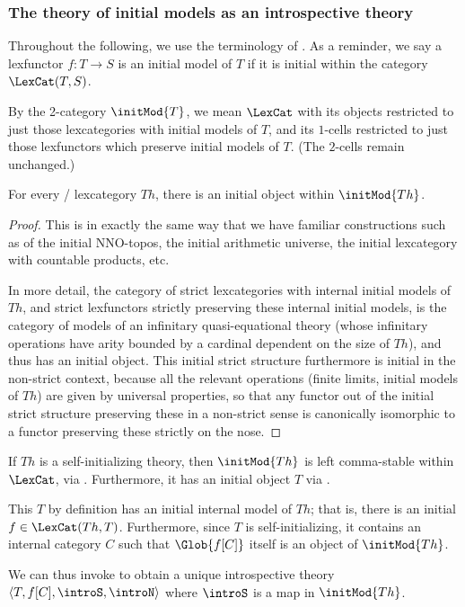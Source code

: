 \subsubsection{The theory of initial models as an introspective theory}
Throughout the following, we use the  terminology of . As a reminder, we say a lexfunctor $f : T \to S$ is an initial model of $T$ if it is initial within the category $\LexCat(T, S)$.

By the 2-category $\initMod{T}$, we mean $\LexCat$ with its objects restricted to just those lexcategories with initial models of $T$, and its $1$-cells restricted to just those lexfunctors which preserve initial models of $T$. (The $2$-cells remain unchanged.)

\begin{theorem}\label{InitialModelWithInitialModel}
For every \setsmall/ lexcategory $Th$, there is an initial object within $\initMod{Th}$.
\end{theorem}
\begin{proof}
This is in exactly the same way that we have familiar constructions such as of the initial NNO-topos, the initial arithmetic universe, the initial lexcategory with countable products, etc.

In more detail, the category of strict lexcategories with internal initial models of $Th$, and strict lexfunctors strictly preserving these internal initial models, is the category of models of an infinitary quasi-equational theory (whose infinitary operations have arity bounded by a cardinal dependent on the size of $Th$), and thus has an initial object. This initial strict structure furthermore is initial in the non-strict context, because all the relevant operations (finite limits, initial models of $Th$) are given by universal properties, so that any functor out of the initial strict structure preserving these in a non-strict sense is canonically isomorphic to a functor preserving these strictly on the nose.
\end{proof}

\begin{construction}
If $Th$ is a self-initializing theory, then $\initMod{Th}$ is left comma-stable within $\LexCat$, via . Furthermore, it has an initial object $T$ via .

This $T$ by definition has an initial internal model of $Th$; that is, there is an initial $f \in \LexCat(Th, T)$. Furthermore, since $T$ is self-initializing, it contains an internal category $C$ such that $\Glob{f[C]}$ itself is an object of $\initMod{Th}$.

We can thus invoke  to obtain a unique introspective theory $\langle T, f[C], \introS, \introN \rangle$ where $\introS$ is a map in $\initMod{Th}$.
\end{construction}

